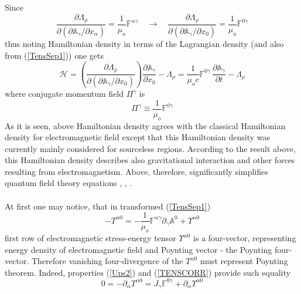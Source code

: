 \documentclass[aps,prx,preprint,groupedaddress,showkeys]{revtex4-2}
\begin{document}
Since 
\begin{equation} \label{HQ1}
\frac{\partial \Lambda_{\rho}}{\partial (\partial \mathbb{A}_{\gamma} / \partial x_{\alpha})}  = \frac{1}{\mu_o} \mathbb{F}^{\alpha \gamma} \quad \to \quad \frac{\partial \Lambda_{\rho}}{\partial (\partial \mathbb{A}_{\gamma} / \partial x_0)} = \frac{1}{\mu_o} \mathbb{F}^{0 \gamma}
\end{equation}
thus noting Hamiltonian density in terms of the Lagrangian density \cite{LDEM} (and also from (\ref{TensSep1})) one gets
\begin{equation} \label{HQ2}
\mathcal{H} = \left ( \frac{\partial \Lambda_{\rho}}{\partial (\partial \mathbb{A}_{\gamma} / \partial x_0)} \right ) \frac{\partial \mathbb{A}_{\gamma}}{\partial x_0} - \Lambda_{\rho} = \frac{1}{\mu_o c} \mathbb{F}^{0 \gamma} \, \frac{\partial \mathbb{A}_{\gamma}}{\partial t} - \Lambda_{\rho}
\end{equation}
where conjugate momentum field $\Pi^{\gamma}$ is
\begin{equation} \label{HQ3}
\Pi^{\gamma} \equiv \frac{1}{\mu_o} \mathbb{F}^{0 \gamma}
\end{equation}
As it is seen, above Hamiltonian density agrees with the classical Hamiltonian density for electromagnetic field \cite{LDEM} except that this Hamiltonian density was currently mainly considered for sourceless regions. According to the result above, this Hamiltonian density describes also gravitational interaction and other forces resulting from electromagnetism. Above, therefore, significantly simplifies quantum field theory equations  \cite{QFT1}, \cite{QFT2}, \cite{QFT3}.\\
~\\
At first one may notice, that in transformed (\ref{TensSep1})
\begin{equation} \label{HQ4}
- T^{\alpha 0} =  - \frac{1}{\mu_o} \mathbb{F}^{\alpha \gamma} \partial_{\gamma} \mathbb{A}^{0} + \Upsilon^{\alpha 0}
\end{equation}
first row of electromagnetic stress-energy tensor $\Upsilon^{\alpha 0}$ is a four-vector, representing energy density of electromagnetic field and Poynting vector \cite{PoV} - the Poynting four-vector. Therefore vanishing four-divergence of the $T^{\alpha 0}$ must represent Poynting theorem. Indeed, properties (\ref{Ups2}) and (\ref{TENSCORR}) provide such equality
\begin{equation} \label{HQ5}
0 = - \partial_{\alpha} T^{\alpha 0} = J_{\gamma} \mathbb{F}^{0 \gamma} + \partial_{\alpha} \Upsilon^{\alpha 0} 
\end{equation}
\end{document}
